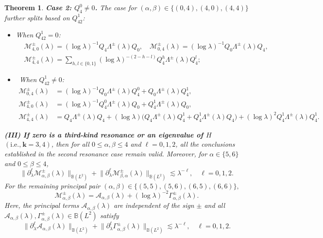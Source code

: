 \documentclass[reqno]{amsart}
\newtheorem{theorem}{Theorem}[section]
\numberwithin{equation}{section}
\begin{document}
\begin{theorem}
	\textbf{Case 2: $Q_4^0 \neq 0$.}   The case for $(\alpha, \beta) \in \{ (0,4), (4,0), (4,4)\}$  further splits based on $Q_{42}^1$:  
	\begin{itemize}  
		\item \textit{ When $Q_{42}^1 = 0$:}  
		$$
		\begin{aligned}
			&\mathcal{M}_{4,0}^\pm(\lambda)=(\log \lambda)^{-1}  Q_4 \Lambda^\pm(\lambda) Q_0,  \quad
			\mathcal{M}_{0,4}^\pm(\lambda)=(\log \lambda)^{-1}  Q_0 \Lambda^\pm(\lambda) Q_4,  \\
			&\mathcal{M}_{4,4}^\pm(\lambda) = \sum_{h,l\in\{0,1\}}(\log \lambda)^{-(2-h-l)} Q_4^h \Lambda^\pm(\lambda) Q_4^l;
		\end{aligned}
		$$	
		\item \ \textit{When $Q_{42}^1 \neq 0$:}  
		\begin{equation*}  
			\begin{aligned}  
				\mathcal{M}_{0,4}^{\pm}(\lambda) &= (\log \lambda)^{-1} Q_0 \Lambda^\pm(\lambda) Q_{4}^0 + Q_0 \Lambda^\pm(\lambda) Q_{4}^1, \\  
				\mathcal{M}_{4,0}^{\pm}(\lambda) &= (\log \lambda)^{-1} Q_{4}^0 \Lambda^\pm(\lambda) Q_0 + Q_{4}^1 \Lambda^\pm(\lambda) Q_0, \\  
				\mathcal{M}_{4,4}^{\pm}(\lambda) &= Q_{4} \Lambda^\pm(\lambda) Q_{4} + (\log\lambda)\bigl(Q_{4} \Lambda^\pm(\lambda) Q_{4}^1+Q_{4}^1 \Lambda^\pm(\lambda) Q_{4}\bigr) + (\log\lambda)^2 Q_{4}^1 \Lambda^\pm(\lambda) Q_{4}^1.
			\end{aligned}  
		\end{equation*}  
	\end{itemize}  
	
	
	\vskip0.1cm
	 \textbf{{\rm (III)} If  zero  is a  third-kind resonance or an eigenvalue of $H$} $(\text{i.e.,}\  \mathbf{k}=3,4 )$,  then
	for all $0 \le \alpha, \beta \le 4$ and $\ell=0,1,2$, all the conclusions established in the second resonance case   remain valid. Moreover,
	for $\alpha \in \{5,6\}$ and $0 \le \beta \le 4$,
	\[  
	\big\|\partial_\lambda^{\ell} \mathcal{M}_{\alpha,\beta}^\pm(\lambda)\big\|_{\mathbb{B}\left(L^2\right)}  
	+ \big\|\partial_\lambda^{\ell} \mathcal{M}_{\beta,\alpha}^\pm(\lambda)\big\|_{\mathbb{B}\left(L^2\right)}  
	\lesssim\lambda^{-\ell},\quad \ell=0,1,2.
	\]  
	For the remaining principal pair $(\alpha,\beta) \in \{(5,5), (5,6), (6,5), (6,6)\},$  
	\[  
	\mathcal{M}_{\alpha,\beta}^\pm(\lambda) = 
	 \mathcal{A}_{\alpha,\beta}(\lambda) + (\log \lambda)^{-2}\Gamma_{\alpha,\beta}^{\pm}(\lambda).  
	\]  
	Here, the principal terms $\mathcal{A}_{\alpha,\beta}(\lambda)$ are independent of the sign $\pm$ and 
	all $\mathcal{A}_{\alpha,\beta}(\lambda), \Gamma_{\alpha,\beta}^{\pm}(\lambda)\in \mathbb{B}(L^2)$  satisfy
	\[
	\big\|\partial_\lambda^\ell \mathcal{A}_{\alpha,\beta}(\lambda)\big\|_{\mathbb{B}(L^2)} + \big\|\partial_\lambda^\ell \Gamma_{\alpha,\beta}^{\pm}(\lambda)\big\| _{\mathbb{B}(L^2)} \lesssim \lambda^{-\ell}, \quad \ell = 0,1,2.
	\]
\end{theorem}
\end{document}
